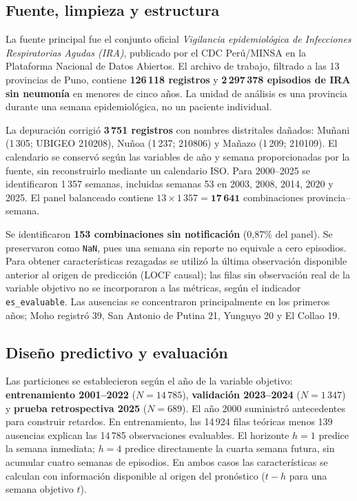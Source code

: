 \documentclass[10pt,a4paper]{article}
\begin{document}
\subsection{Fuente, limpieza y estructura}

La fuente principal fue el conjunto oficial \textit{Vigilancia epidemiológica de Infecciones Respiratorias Agudas (IRA)}, publicado por el CDC Perú/MINSA en la Plataforma Nacional de Datos Abiertos. El archivo de trabajo, filtrado a las 13 provincias de Puno, contiene \textbf{126\,118 registros} y \textbf{2\,297\,378 episodios de IRA sin neumonía} en menores de cinco años. La unidad de análisis es una provincia durante una semana epidemiológica, no un paciente individual.

La depuración corrigió \textbf{3\,751 registros} con nombres distritales dañados: Muñani (1\,305; UBIGEO 210208), Nuñoa (1\,237; 210806) y Mañazo (1\,209; 210109). El calendario se conservó según las variables de año y semana proporcionadas por la fuente, sin reconstruirlo mediante un calendario ISO. Para 2000--2025 se identificaron 1\,357 semanas, incluidas semanas 53 en 2003, 2008, 2014, 2020 y 2025. El panel balanceado contiene $13\times1\,357=\mathbf{17\,641}$ combinaciones provincia--semana.

Se identificaron \textbf{153 combinaciones sin notificación} (0,87\% del panel). Se preservaron como \texttt{NaN}, pues una semana sin reporte no equivale a cero episodios. Para obtener características rezagadas se utilizó la última observación disponible anterior al origen de predicción (LOCF causal); las filas sin observación real de la variable objetivo no se incorporaron a las métricas, según el indicador \texttt{es\_evaluable}. Las ausencias se concentraron principalmente en los primeros años; Moho registró 39, San Antonio de Putina 21, Yunguyo 20 y El Collao 19.

\subsection{Diseño predictivo y evaluación}

Las particiones se establecieron según el año de la variable objetivo: \textbf{entrenamiento 2001--2022} ($N=14\,785$), \textbf{validación 2023--2024} ($N=1\,347$) y \textbf{prueba retrospectiva 2025} ($N=689$). El año 2000 suministró antecedentes para construir retardos. En entrenamiento, las 14\,924 filas teóricas menos 139 ausencias explican las 14\,785 observaciones evaluables. El horizonte $h=1$ predice la semana inmediata; $h=4$ predice directamente la cuarta semana futura, sin acumular cuatro semanas de episodios. En ambos casos las características se calculan con información disponible al origen del pronóstico ($t-h$ para una semana objetivo $t$).
\end{document}
